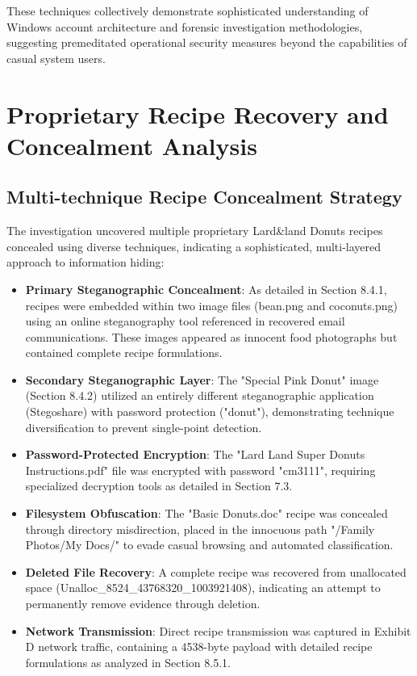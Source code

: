 These techniques collectively demonstrate sophisticated understanding of Windows account architecture and forensic investigation methodologies, suggesting premeditated operational security measures beyond the capabilities of casual system users.

\section{Proprietary Recipe Recovery and Concealment Analysis}
\subsection{Multi-technique Recipe Concealment Strategy}
The investigation uncovered multiple proprietary Lard\&land Donuts recipes concealed using diverse techniques, indicating a sophisticated, multi-layered approach to information hiding:

\begin{itemize}
    \item \textbf{Primary Steganographic Concealment}: As detailed in Section 8.4.1, recipes were embedded within two image files (bean.png and coconuts.png) using an online steganography tool referenced in recovered email communications. These images appeared as innocent food photographs but contained complete recipe formulations.
    
    \item \textbf{Secondary Steganographic Layer}: The "Special Pink Donut" image (Section 8.4.2) utilized an entirely different steganographic application (Stegoshare) with password protection ("donut"), demonstrating technique diversification to prevent single-point detection.
    
    \item \textbf{Password-Protected Encryption}: The "Lard Land Super Donuts Instructions.pdf" file was encrypted with password "cm3111", requiring specialized decryption tools as detailed in Section 7.3.
    
    \item \textbf{Filesystem Obfuscation}: The "Basic Donuts.doc" recipe was concealed through directory misdirection, placed in the innocuous path "/Family Photos/My Docs/" to evade casual browsing and automated classification.
    
    \item \textbf{Deleted File Recovery}: A complete recipe was recovered from unallocated space (Unalloc\_8524\_43768320\_1003921408), indicating an attempt to permanently remove evidence through deletion.
    
    \item \textbf{Network Transmission}: Direct recipe transmission was captured in Exhibit D network traffic, containing a 4538-byte payload with detailed recipe formulations as analyzed in Section 8.5.1.
\end{itemize}


